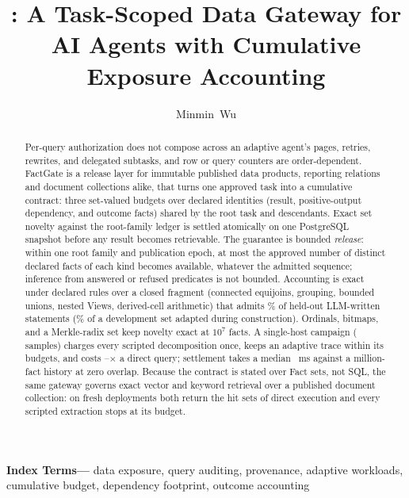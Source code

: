 \documentclass[10pt,journal,compsoc]{IEEEtran}
\title{\systemname: A Task-Scoped Data Gateway for AI Agents with
Cumulative Exposure Accounting}
\author{Minmin~Wu%
\IEEEcompsocitemizethanks{\IEEEcompsocthanksitem M.~Wu is with China Telecom Global Limited.\protect\\
E-mail: \mbox{wuminmin@chinatelecomglobal.com}.}}
\date{}
\newenvironment{IEEEkeywords}{\par\small\noindent\textbf{Index Terms---}}{\par}
\newcommand{\system}{FactGate\xspace}
\begin{document}
\maketitle

\begin{abstract}
Per-query authorization does not compose across an adaptive agent's pages,
retries, rewrites, and delegated subtasks, and row or query counters are
order-dependent. \system is a release layer for immutable published data
products, reporting relations and document collections alike, that turns one
approved task into a cumulative contract: three
set-valued budgets over declared identities (result, positive-output
dependency, and outcome facts) shared by the root task and descendants.
Exact set novelty against the root-family ledger is settled atomically on one
PostgreSQL snapshot before any result becomes retrievable. The guarantee is bounded
\emph{release}: within one root family and publication epoch, at most
the approved number of distinct declared facts of each kind becomes
available, whatever the admitted sequence; inference from answered or refused
predicates is not bounded. Accounting is exact under declared rules over
a closed fragment (connected
equijoins, grouping, bounded unions, nested Views, derived-cell arithmetic)
that admits \HeldoutLowerablePct\% of \HeldoutQueries{} held-out LLM-written
statements (\AgentWorkloadLowerablePct\% of
a development set adapted during construction). Ordinals, bitmaps, and a
Merkle-radix set keep novelty exact at $10^7$ facts. A
single-host campaign (\FinalVFivePublicationMeasuredSamples{} samples)
charges every scripted decomposition once, keeps an adaptive trace within
its budgets, and costs
\FinalVFivePublicationOverheadMin{}--\FinalVFivePublicationOverheadMax{}$\times$
a direct query; settlement takes a median
\FinalVFivePublicationScaleSettleMillionMS{}~ms against a million-fact
history at zero overlap. Because the contract is stated over Fact sets, not
SQL, the same gateway governs exact vector and keyword retrieval over a
published document collection: on fresh deployments both return the hit
sets of direct execution and every scripted extraction stops at its budget.
\end{abstract}

\begin{IEEEkeywords}
data exposure, query auditing, provenance, adaptive workloads, cumulative
budget, dependency footprint, outcome accounting
\end{IEEEkeywords}
\end{document}
